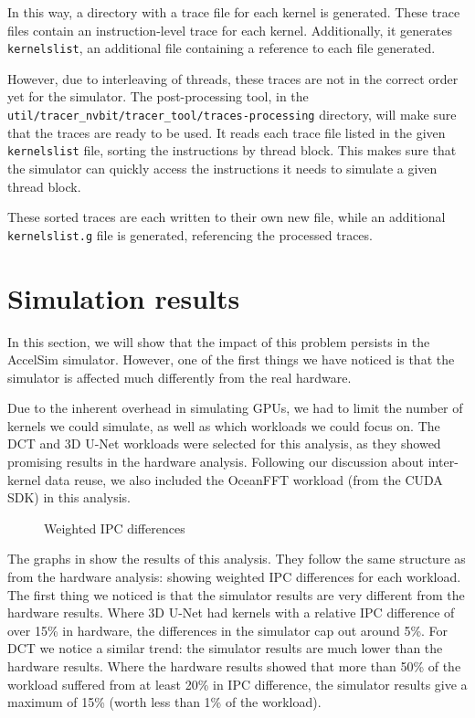 In this way, a directory with a trace file for each kernel is generated.
These trace files contain an instruction-level trace for each kernel.
Additionally, it generates \verb|kernelslist|, an additional file containing a reference to each file generated.

However, due to interleaving of threads, these traces are not in the correct order yet for the simulator.
The post-processing tool, in the \verb|util/tracer_nvbit/tracer_tool/traces-processing| directory, will make sure that the traces are ready to be used.
It reads each trace file listed in the given \verb|kernelslist| file, sorting the instructions by thread block.
This makes sure that the simulator can quickly access the instructions it needs to simulate a given thread block.

These sorted traces are each written to their own new file, while an additional \verb|kernelslist.g| file is generated, referencing the processed traces.

\FloatBarrier
\section{Simulation results}\label{sec:simulation-results}
In this section, we will show that the impact of this problem persists in the AccelSim simulator.
However, one of the first things we have noticed is that the simulator is affected much differently from the real hardware.

Due to the inherent overhead in simulating GPUs, we had to limit the number of kernels we could simulate, as well as which workloads we could focus on.
The DCT and 3D U-Net workloads were selected for this analysis, as they showed promising results in the hardware analysis.
Following our discussion about inter-kernel data reuse, we also included the OceanFFT workload (from the CUDA SDK) in this analysis.

\begin{figure}[ht]
    \centering
    \caption{Weighted IPC differences}
    \label{fig:sim_ipc_diff}
\end{figure}

The graphs in  show the results of this analysis.
They follow the same structure as  from the hardware analysis: showing weighted IPC differences for each workload.
The first thing we noticed is that the simulator results are very different from the hardware results.
Where 3D U-Net had kernels with a relative IPC difference of over 15\% in hardware, the differences in the simulator cap out around 5\%.
For DCT we notice a similar trend: the simulator results are much lower than the hardware results.
Where the hardware results showed that more than 50\% of the workload suffered from at least 20\% in IPC difference, the simulator results give a maximum of 15\% (worth less than 1\% of the workload).

